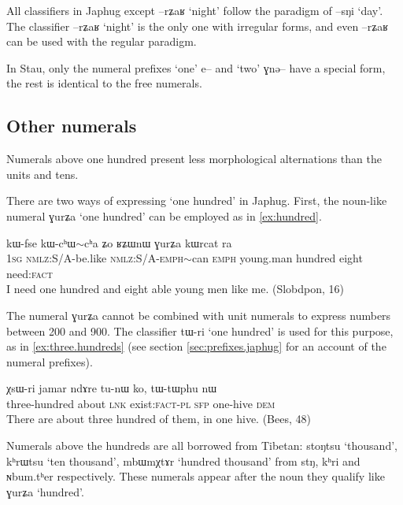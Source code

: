 \documentclass[oldfontcommands,oneside,a4paper,12pt]{article}
\newcommand{\ipa}[1]{{\phon#1}}
\newcommand{\redp}{$\mathtt{\sim}$}
\begin{document}
All classifiers in Japhug except \ipa{--rʑaʁ} `night' follow the paradigm of \ipa{--sŋi} `day'. The classifier \ipa{--rʑaʁ} `night' is the only one with irregular forms, and even  \ipa{--rʑaʁ} can be used with the regular paradigm.
 

 
 In Stau, only the numeral prefixes  `one' \ipa{e--} and `two' \ipa{ɣnə--} have a special form, the rest is identical to the free numerals.
 
 \subsection{Other numerals}
Numerals above one hundred present less morphological alternations than the units and tens.
 
 There are two ways of expressing `one hundred' in Japhug. First, the noun-like numeral \ipa{ɣurʑa}   `one hundred' can be employed as in \ref{ex:hundred}.

\begin{exe}
\ex \label{ex:hundred}
\gll \ipa{aʑo} 	\ipa{kɯ-fse} 	\ipa{kɯ-cʰɯ\redp{}cʰa} 	\ipa{ʑo} 	\ipa{ʁʑɯnɯ} 	\ipa{ɣurʑa} 	\ipa{kɯrcat} 	\ipa{ra} \\
\textsc{1sg} \textsc{nmlz}:S/A-be.like  \textsc{nmlz}:S/A-\textsc{emph}\redp{}can \textsc{emph} young.man hundred eight need:\textsc{fact} \\
\glt I need one hundred and eight able young men like me. (Slobdpon, 16)
\end{exe}

The numeral \ipa{ɣurʑa}  cannot be combined with unit numerals to express numbers between 200 and 900. The classifier \ipa{tɯ-ri} `one hundred' is used for this purpose, as in \ref{ex:three.hundreds} (see section \ref{sec:prefixes.japhug} for an account of the numeral prefixes).
\begin{exe}
\ex \label{ex:three.hundreds}
\gll
\ipa{χsɯ-ri} 	\ipa{jamar} 	\ipa{ndɤre} 	\ipa{tu-nɯ} 	\ipa{ko,} 	\ipa{tɯ-tɯphu} 	\ipa{nɯ} \\
three-hundred about \textsc{lnk} exist:\textsc{fact-pl} \textsc{sfp} one-hive \textsc{dem} \\
\glt There are about three hundred of them, in one hive. (Bees, 48)
\end{exe}
 
  

Numerals above the hundreds are all borrowed from Tibetan: \ipa{stoŋtsu} `thousand', \ipa{kʰrɯtsu} `ten thousand', \ipa{mbɯmχtɤr} `hundred thousand' from \ipa{stŋ}, \ipa{kʰri} and \ipa{ɴbum.tʰer} respectively. These numerals appear after the noun they qualify like \ipa{ɣurʑa} `hundred'.  
 
\end{document}
